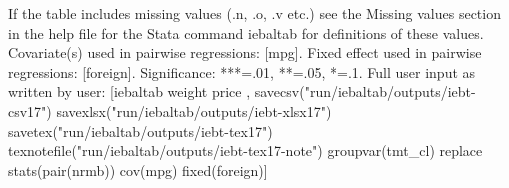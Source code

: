 If the table includes missing values (.n, .o, .v etc.) see the Missing values section in the help file for the Stata command iebaltab for definitions of these values. Covariate(s) used in pairwise regressions: [mpg]. Fixed effect used in pairwise regressions: [foreign]. Significance: ***=.01, **=.05, *=.1. Full user input as written by user: [iebaltab weight price , savecsv("run/iebaltab/outputs/iebt-csv17") savexlsx("run/iebaltab/outputs/iebt-xlsx17") savetex("run/iebaltab/outputs/iebt-tex17") texnotefile("run/iebaltab/outputs/iebt-tex17-note") groupvar(tmt\_cl) replace stats(pair(nrmb)) cov(mpg) fixed(foreign)] 
